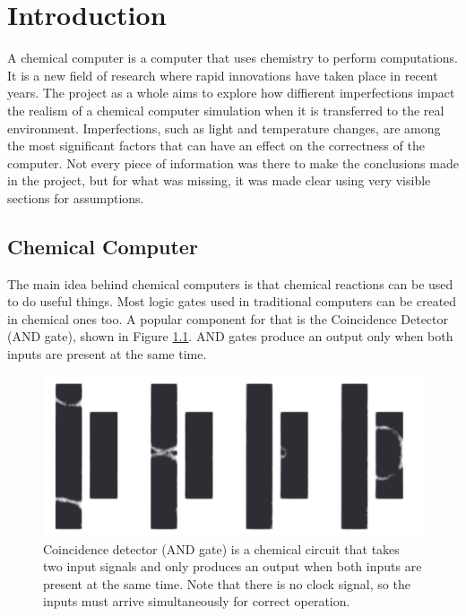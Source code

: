 \chapter{Introduction}\label{ch:introduction}

A chemical computer is a computer that uses chemistry to perform computations. It is a new field of research where rapid innovations have taken place in recent years.
The project as a whole aims to explore how diffierent imperfections impact the realism of a chemical computer simulation when it is transferred to the real environment. 
Imperfections, such as light and temperature changes, are among the most significant factors that can have an effect on the correctness of the computer.
Not every piece of information was there to make the conclusions made in the project, but for what was missing, it was made clear using very visible sections for assumptions.

\section{Chemical Computer}
The main idea behind chemical computers is that chemical reactions can be used to do useful things. 
Most logic gates used in traditional computers can be created in chemical ones too.
A popular component for that is the Coincidence Detector (AND gate), shown in Figure \ref{fig:coincidence-detector-sequence}. AND gates produce an output only when both inputs are present at the same time.

\begin{figure}
    \centering
    \includegraphics[width=0.75\linewidth]{images/Screenshot 2024-03-10 at 19.40.45.png}
    \caption{Coincidence detector (AND gate) is a chemical circuit that takes two input signals and only produces an output when both inputs are present at the same time. Note that there is no clock signal, so the inputs must arrive simultaneously for correct operation. \citep{gorecki2003chemical}}
    \label{fig:coincidence-detector-sequence}
\end{figure}




